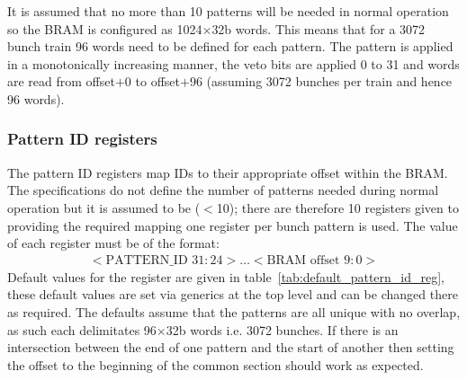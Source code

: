 \documentclass[]{article}
\begin{document}
    It is assumed that no more than 10 patterns will be needed in normal operation so the BRAM is configured as 1024\( \times  \)32b words. This means that for a 3072 bunch train 96 words need to be defined for each pattern. The pattern is applied in a monotonically increasing manner, the veto bits are applied 0 to 31 and words are read from offset\( + 0 \) to offset\( + 96 \) (assuming 3072 bunches per train and hence 96 words). 
  

    \subsubsection{Pattern ID registers} %
    \label{sub:pattern_id_registers}
    The pattern ID registers map IDs to their appropriate offset within the BRAM. The specifications do not define the number of patterns needed during normal operation but it is assumed to be (\( < \)10); there are therefore 10 registers given to providing the required mapping one register per bunch pattern is used. The value of each register must be of the format:
    \begin{align} \label{fmt:pattern_id}
        <\text{PATTERN\_ID } 31:24>\ldots<\text{BRAM offset } 9:0> 
    \end{align}
    Default values for the register are given in table~\ref{tab:default_pattern_id_reg}, these default values are set via generics at the top level and can be changed there as required. The defaults assume that the patterns are all unique with no overlap, as such each delimitates 96\( \times \)32b words i.e. 3072 bunches. If there is an intersection between the end of one pattern and the start of another then setting the offset to the beginning of the common section should work as expected.
\end{document}
